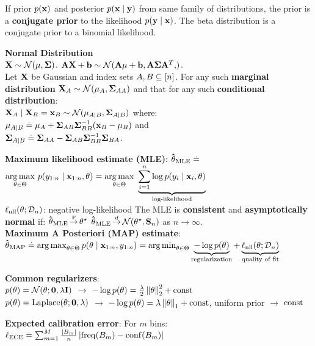If prior $p(\mathbf{x})$ and posterior $p(\mathbf{x} \mid \mathbf{y})$ from same family of distributions, the prior is a \textbf{conjugate prior} to the likelihood $p(\mathbf{y} \mid \mathbf{x})$. The beta distribution is a conjugate prior to a binomial likelihood. \\
\begin{framed}
    \textbf{Normal Distribution} \\
    $\rX\sim\N{\vmu}{\mSigma}$. $\mA\rX+\vb\sim\N{\mA\mu+\vb,\mA\mSigma \mA^T}$.\\
    Let $\mathbf{X}$ be Gaussian and index sets $A, B \subseteq [n]$.
    For any such \textbf{marginal distribution} $\rX_A \sim \N{\vmu_\sA}{\mSigma_{\sA\sA}}$ and that for any such \textbf{conditional distribution}: \\
    $ \rX_\sA \mid \rX_\sB = \vx_\sB \sim \N{\vmu_{\sA \mid \sB}}{\mSigma_{\sA \mid \sB}}$ where: \\
        $\mathbf{\mu}_{A \mid B} \overset{.}{=} \mathbf{\mu}_A + \mathbf{\Sigma}_{AB}\mathbf{\Sigma}_{BB}^{-1}(\mathbf{x}_B - \mathbf{\mu}_B)$ and \\
        $\mathbf{\Sigma}_{A \mid B} \overset{.}{=} \mathbf{\Sigma}_{AA} - \mathbf{\Sigma}_{AB}\mathbf{\Sigma}_{BB}^{-1}\mathbf{\Sigma}_{BA}$.
\end{framed}
\textbf{Maximum likelihood estimate (MLE)}: $\mathbf{\hat{\theta}}_{\mathrm{MLE}} \overset{.}{=}$
 $\underset{\mathbf{\theta} \in \Theta}{\operatorname*{arg\,max}}\ p(y_{1:n} \mid \mathbf{x}_{1:n}, \mathbf{\theta}) 
  = \underset{\mathbf{\theta} \in \Theta}{\operatorname*{arg\,max}}\ \underbrace{\sum_{i=1}^n \log p(y_i \mid \mathbf{x}_i, \mathbf{\theta})}_{\text{{log-likelihood}}}$ \\
$\ell_\mathrm{nll}(\mathbf{\theta}; \mathcal{D}_n)$: negative log-likelihood
The MLE is \textbf{consistent} and \textbf{asymptotically normal} if: $\mathbf{\hat{\theta}}_{\mathrm{MLE}} \operatorname*{\smash{\overset{\mathbb{P}}{\rightarrow}}} \mathbf{\theta}^\star$ $\vthetahat_\MLE \convd \N{\opt{\vtheta}}{\mS_n}$ as $n \to \infty$. \\
\textbf{{Maximum A Posteriori (MAP) estimate}}:   $\mathbf{\hat{\theta}}_{\mathrm{MAP}} \overset{.}{=} \operatorname*{arg\,max}_{\mathbf{\theta} \in \Theta} p(\mathbf{\theta} \mid \mathbf{x}_{1:n}, y_{1:n}) 
  = \operatorname*{arg\,min}_{\mathbf{\theta} \in \Theta} \underbrace{- \log p(\mathbf{\theta})}_{\text{regularization}} + \underbrace{\ell_\mathrm{nll}(\mathbf{\theta}; \mathcal{D}_n)}_{\text{quality of fit}}$
\begin{framed}
\textbf{Common regularizers}: \\
 $p(\vtheta) = \N[\vtheta]{\vzero}{\lambda \mI}$ $\rightarrow$ $-\log p(\vtheta) = \frac{\lambda}{2} \norm{\vtheta}_2^2 + \const$ \\
 $p(\vtheta) = \Laplace[\vtheta]{\vzero}{\lambda}$ $\rightarrow$ $-\log p(\vtheta) = \lambda \norm{\vtheta}_1 + \const$,
 uniform prior $\rightarrow$ $\mathrm{const}$
 \end{framed}
\begin{framed}
     \textbf{Expected calibration error}: For $m$ bins: $\ell_{\mathrm{ECE}} \overset{.}{=} \sum_{m=1}^M \frac{\left| B_m \right|}{n} \left| \mathrm{freq}(B_m) - \mathrm{conf}(B_m) \right|$
 \end{framed}

